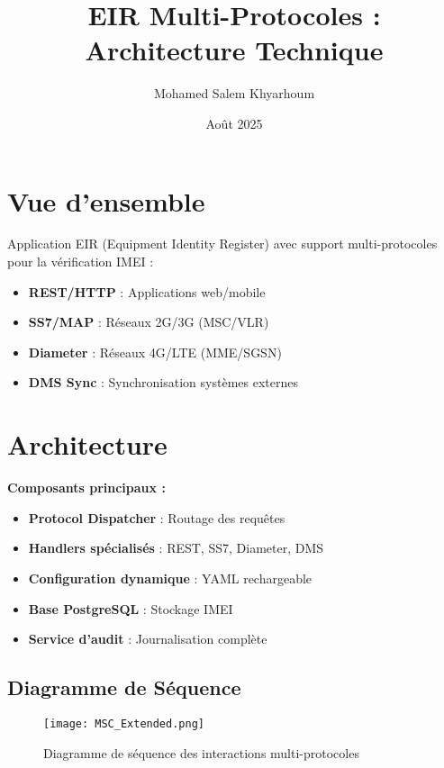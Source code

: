 \documentclass[11pt]{article}
\title{EIR Multi-Protocoles : Architecture Technique}
\author{Mohamed Salem Khyarhoum}
\date{Août 2025}
\begin{document}
\maketitle

\tableofcontents
\newpage

\section{Vue d'ensemble}

Application EIR (Equipment Identity Register) avec support multi-protocoles pour la vérification IMEI :
\begin{itemize}
    \item \textbf{REST/HTTP} : Applications web/mobile
    \item \textbf{SS7/MAP} : Réseaux 2G/3G (MSC/VLR)
    \item \textbf{Diameter} : Réseaux 4G/LTE (MME/SGSN)
    \item \textbf{DMS Sync} : Synchronisation systèmes externes
\end{itemize}

\section{Architecture}

\textbf{Composants principaux :}
\begin{itemize}
    \item \textbf{Protocol Dispatcher} : Routage des requêtes
    \item \textbf{Handlers spécialisés} : REST, SS7, Diameter, DMS
    \item \textbf{Configuration dynamique} : YAML rechargeable
    \item \textbf{Base PostgreSQL} : Stockage IMEI
    \item \textbf{Service d'audit} : Journalisation complète
\end{itemize}

\subsection{Diagramme de Séquence}

\begin{figure}[H]
\centering
\texttt{[image: MSC\_Extended.png]}
\caption{Diagramme de séquence des interactions multi-protocoles}
\label{fig:msc_sequence}
\end{figure}
\end{document}
